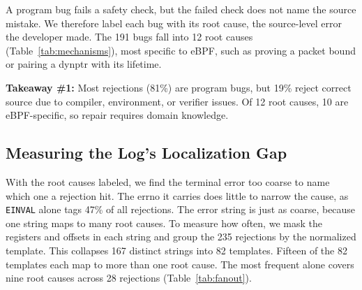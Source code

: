 A program bug fails a safety check, but the failed check does not name the source mistake.
We therefore label each bug with its root cause, the source-level error the developer made.
The 191 bugs fall into 12 root causes (Table~\ref{tab:mechanisms}), most specific to eBPF, such as proving a packet bound or pairing a dynptr with its lifetime.

\begin{tcolorbox}[colback=blue!5!white,colframe=gray!75!black,left=1mm, right=1mm, top=0.5mm, bottom=0.5mm, arc=1mm]
\textbf{Takeaway \#1:} Most rejections (81\%) are program bugs, but 19\% reject correct source due to compiler, environment, or verifier issues. Of 12 root causes, 10 are eBPF-specific, so repair requires domain knowledge.
\end{tcolorbox}



\subsection{Measuring the Log's Localization Gap}
\label{sec:study:gap}

With the root causes labeled, we find the terminal error too coarse to name which one a rejection hit.
The errno it carries does little to narrow the cause, as \texttt{EINVAL} alone tags 47\% of all rejections.
The error string is just as coarse, because one string maps to many root causes.
To measure how often, we mask the registers and offsets in each string and group the 235 rejections by the normalized template.
This collapses 167 distinct strings into 82 templates.
Fifteen of the 82 templates each map to more than one root cause.
The most frequent alone covers nine root causes across 28 rejections (Table~\ref{tab:fanout}).

